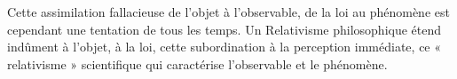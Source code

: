 Cette assimilation fallacieuse de l’objet à l’observable, de la loi au
phénomène est cependant une tentation de tous les temps. Un Relativisme
philosophique étend indûment à l’objet, à la loi, cette subordination à
la perception immédiate, ce « relativisme » scientifique qui caractérise
l’observable et le phénomène.


